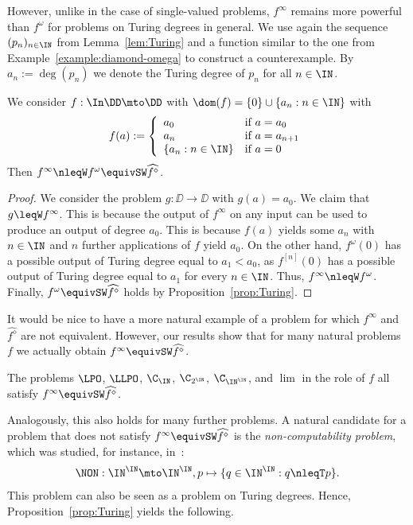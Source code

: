 \noindent
However, unlike in the case of single-valued problems, $f^\infty$ remains more powerful
than $f^\omega$ for problems on Turing degrees in general.
We use again the sequence $(p_n)_{n\in\IN}$ from Lemma~\ref{lem:Turing} and a function similar to the
one from Example~\ref{example:diamond-omega} to construct a counterexample.
By $a_n:=\deg(p_n)$ we denote the Turing degree of $p_n$ for all $n\in\IN$.

\begin{exa}
\label{example:infty-omega}
We consider $f:\In\DD\mto\DD$
with $\dom(f)=\{0\}\cup\{a_n:n\in\IN\}$ with
\[f(a):=\left\{\begin{array}{ll}
a_0 & \mbox{if $a=a_0$}\\
a_n & \mbox{if $a=a_{n+1}$}\\
\{a_n:n\in\IN\} & \mbox{if $a=0$}
\end{array}\right.\]
Then $f^\infty\nleqW f^\omega\equivSW\widehat{f^\diamond}$.
\end{exa}
\begin{proof}
We consider the problem $g:\DD\to\DD$ with $g(a)=a_0$. We claim that $g\leqW f^\infty$.
This is because the output of $f^\infty$ on any input can be used to produce an output of 
degree $a_0$.
This is because $f(a)$ yields some $a_n$ with $n\in\IN$ and $n$ further applications of $f$ yield $a_0$.
On the other hand, $f^\omega(0)$ has
a possible output of Turing degree equal to $a_1<a_0$, as $f^{[n]}(0)$ has a possible output
of Turing degree equal to $a_{1}$ for every $n\in\IN$. 
Thus, $f^\infty\nleqW f^\omega$. Finally, $f^\omega\equivSW\widehat{f^\diamond}$ holds by Proposition~\ref{prop:Turing}.
\end{proof}

\noindent
It would be nice to have a more natural example of a problem for which $f^\infty$ and $\widehat{f^\diamond}$
are not equivalent. However, our results show that for many natural problems $f$ we actually obtain 
$f^\infty\equivSW\widehat{f^\diamond}$.

\begin{cor}
The problems $\LPO$, $\LLPO$, $\C_\IN$, $\C_{2^\IN}$, $\C_{\IN^\IN}$, and $\lim$
in the role of $f$ all satisfy $f^\infty\equivSW\widehat{f^\diamond}$.
 \end{cor}

\noindent
Analogously, this also holds for many further problems.
A natural candidate for a problem that does not satisfy $f^\infty\equivSW\widehat{f^\diamond}$
is the {\em non-computability problem}, which was studied,
for instance, in~\cite{BHK17a,Bra23}:
\[\NON:\IN^\IN\mto\IN^\IN,p\mapsto\{q\in\IN^\IN:q\nleqT p\}.\]
This problem can also be seen as a problem on Turing degrees.
Hence, Proposition~\ref{prop:Turing} yields the following.

